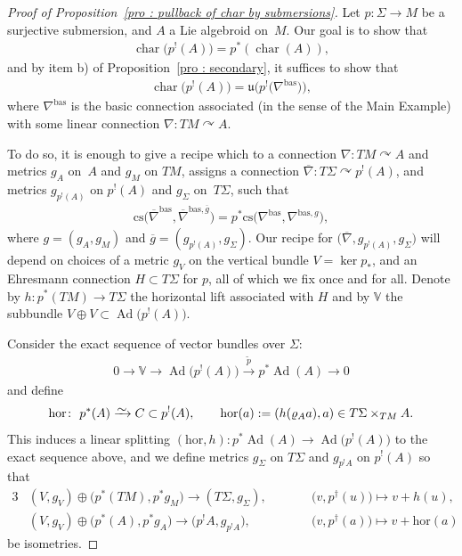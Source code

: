 \documentclass[pdftex]{sigma}
\numberwithin{equation}{section}
\newcommand{\diffto}{\xrightarrow{\raisebox{-0.2 em}[0pt][0pt]{\smash{\ensuremath{\sim}}}}}
\newcommand{\rmap}{\longrightarrow}
\newcommand{\acts}{\curvearrowright}
\newcommand{\8}{\infty}
\begin{document}
\begin{proof}[Proof of Proposition~\ref{pro : pullback of char by submersions}] Let $p\colon \Sigma \to M$ be a surjective submersion, and $A$ a Lie algebroid on~$M$. Our goal is to show that\begin{gather*}\operatorname{char}\big(p^!(A)\big) = p^*(\operatorname{char}(A)),\end{gather*}and by item b) of Proposition~\ref{pro : secondary}, it suffices to show that\begin{gather*}\operatorname{char}\big(p^!(A)\big)=\mathfrak{u}\big(p^!\big(\nabla^{\mathrm{bas}}\big)\big),\end{gather*}where $\nabla^{\mathrm{bas}}$ is the basic connection associated (in the sense of the Main Example) with some linear connection $\nabla\colon TM \acts A$.

 To do so, it is enough to give a recipe which to a connection $\nabla\colon TM \acts A$ and metrics $g_A$ on~$A$ and $g_M$ on $TM$, assigns a connection $\overline{\nabla}\colon T\Sigma \acts p^!(A)$, and metrics $g_{p^!(A)}$ on $p^!(A)$ and $g_{\Sigma}$ on~$T\Sigma$, such that
\begin{gather}\label{ast-ast}
 \mathrm{cs}\big(\overline{\nabla}^{\mathrm{bas}},\overline{\nabla}^{\mathrm{bas},\overline{g}}\big) = p^*\mathrm{cs}\big(\nabla^{\mathrm{bas}},\nabla^{\mathrm{bas},g}\big),
\end{gather}where $g=(g_{A},g_{M})$ and $\overline{g}=(g_{p^!(A)},g_{\Sigma})$. Our recipe for $\big(\overline{\nabla},g_{p^!(A)},g_{\Sigma}\big)$ will depend on choices of a metric $g_V$ on the vertical bundle $V=\ker p_*$, and an Ehresmann connection $H \subset T\Sigma$ for $p$, all of which we fix once and for all. Denote by $h\colon p^*(TM) \to T\Sigma$ the horizontal lift associated with $H$ and by $\mathbb{V}$ the subbundle $V \oplus V \subset \operatorname{Ad}\big(p^!(A)\big)$.

Consider the exact sequence of vector bundles over $\Sigma$:
\begin{gather*}
0 \rmap \mathbb{V} \rmap \operatorname{Ad}\big(p^!(A)\big) \stackrel{\widetilde{p}}{\rmap} p^*\operatorname{Ad}(A) \rmap 0
\end{gather*}and define
\begin{gather*}
 \mathrm{hor}\colon \ p^*(A) \diffto C \subset p^!(A), \qquad \mathrm{hor}(a):=(h(\varrho_A a),a) \in T\Sigma \times_{TM}A.
\end{gather*}This induces a linear splitting $(\mathrm{hor},h)\colon p^*\operatorname{Ad}(A) \to \operatorname{Ad}\big(p^!(A)\big)$ to the exact sequence above, and we define metrics $g_{\Sigma}$ on $T\Sigma$ and $g_{p^!A}$ on $p^!(A)$ so that
 \begin{alignat*}{3}
 & (V,g_V) \oplus \big(p^*(TM),p^*g_M\big) \rmap (T\Sigma,g_{\Sigma}), \qquad && \big(v,p^{\dagger}(u)\big) \mapsto v+h(u), &\\
 & (V,g_V) \oplus \big(p^*(A),p^*g_A\big) \rmap \big(p^!A,g_{p^!A}\big),\qquad && \big(v,p^{\dagger}(a)\big) \mapsto v+\mathrm{hor}(a) &
 \end{alignat*}be isometries.


\end{proof}
\end{document}
